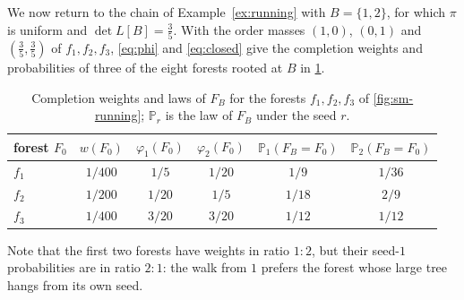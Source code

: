 \documentclass[onefignum,onetabnum,nohypdvips]{siamart250211}
\numberwithin{theorem}{section}
\numberwithin{equation}{section}
\newcommand{\pr}{\mathbb{P}}
\begin{document}
\begin{example}\label{ex:stopped}
We now return to the chain of Example~\ref{ex:running} with $B=\{1,2\}$, for
which $\pi$ is uniform and $\det L[B]=\tfrac35$. With the order masses
$(1,0)$, $(0,1)$ and $(\tfrac35,\tfrac35)$ of $f_1,f_2,f_3$,
\eqref{eq:phi} and \eqref{eq:closed} give the completion weights and
probabilities of three of the eight forests rooted at $B$ in
\cref{tab:completion}.

\begin{table}[ht]
    \caption{Completion weights and laws of $F_B$ for the forests
    $f_1,f_2,f_3$ of \cref{fig:sm-running}; $\pr_r$ is the law of $F_B$
    under the seed $r$.}\label{tab:completion}
    \centering
    \small
    \begin{tabular}{@{}lccccc@{}}
        \toprule
        forest $F_0$ & $w(F_0)$ & $\varphi_1(F_0)$ & $\varphi_2(F_0)$ & $\pr_1(F_B=F_0)$ & $\pr_2(F_B=F_0)$ \\
        \midrule
        $f_1$ & $1/400$ & $1/5$ & $1/20$ & $1/9$ & $1/36$ \\
        $f_2$ & $1/200$ & $1/20$ & $1/5$ & $1/18$ & $2/9$ \\
        $f_3$ & $1/400$ & $3/20$ & $3/20$ & $1/12$ & $1/12$ \\
        \bottomrule
    \end{tabular}
\end{table}
\smallskip
Note that
the first two forests have weights in ratio $1{:}2$, but their seed-$1$
probabilities are in ratio $2{:}1$: the walk from $1$ prefers the forest
whose large tree hangs from its own seed. 
\end{example}
\end{document}
